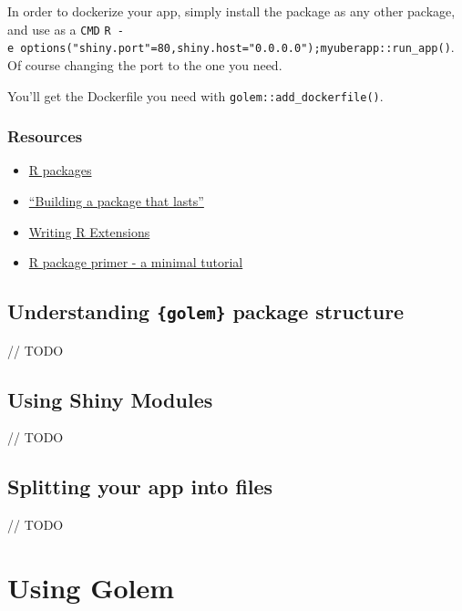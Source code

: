 \documentclass[]{book}
\begin{document}
In order to dockerize your app, simply install the package as any other package, and use as a \texttt{CMD} \texttt{R\ -e\ \textquotesingle{}options("shiny.port"=80,shiny.host="0.0.0.0");myuberapp::run\_app()\textquotesingle{}}. Of course changing the port to the one you need.

You'll get the Dockerfile you need with \texttt{golem::add\_dockerfile()}.

\hypertarget{resources}{%
\subsection{Resources}\label{resources}}

\begin{itemize}
\item
  \href{http://r-pkgs.had.co.nz/}{R packages}
\item
  \href{https://speakerdeck.com/colinfay/building-a-package-that-lasts-erum-2018-workshop}{``Building a package that lasts''}
\item
  \href{https://cran.r-project.org/doc/manuals/r-release/R-exts.html\#Creating-R-packages}{Writing R Extensions}
\item
  \href{https://kbroman.org/pkg_primer/}{R package primer - a minimal tutorial}
\end{itemize}

\hypertarget{understanding-golem-package-structure}{%
\section{\texorpdfstring{Understanding \texttt{\{golem\}} package structure}{Understanding \{golem\} package structure}}\label{understanding-golem-package-structure}}

// TODO

\hypertarget{using-shiny-modules}{%
\section{Using Shiny Modules}\label{using-shiny-modules}}

// TODO

\hypertarget{splitting-your-app-into-files}{%
\section{Splitting your app into files}\label{splitting-your-app-into-files}}

// TODO

\hypertarget{golem}{%
\chapter{Using Golem}\label{golem}}
\end{document}
